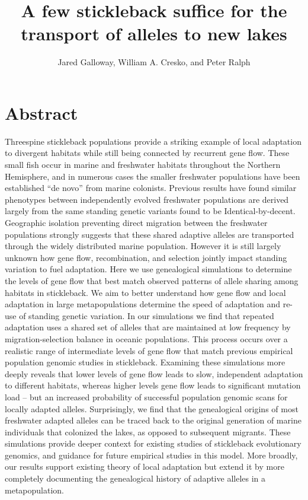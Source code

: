 \documentclass{article}
\begin{document}
\title{A few stickleback suffice for the transport of alleles to new lakes}
\author{Jared Galloway, William A. Cresko, and Peter Ralph}
\maketitle


\section*{Abstract}

Threespine stickleback populations provide a striking example of local adaptation to divergent habitats while still being connected by recurrent gene flow. 
These small fish occur in marine and freshwater habitats throughout the Northern Hemisphere, and in numerous cases the smaller freshwater populations have been established ``de novo'' from marine colonists. 
Previous results have found similar phenotypes between independently evolved freshwater populations are derived largely from the same standing genetic variants found to be Identical-by-decent.
Geographic isolation preventing direct migration between the freshwater populations strongly suggests that these shared adaptive alleles are transported through the widely distributed marine population.
However it is still largely unknown how gene flow, recombination, and selection jointly impact standing variation to fuel adaptation.
Here we use genealogical simulations to determine the levels of gene flow that best match observed patterns of allele sharing among habitats in stickleback.
We aim to better understand how gene flow and local adaptation in large metapopulations determine the speed of adaptation and re-use of standing genetic variation. 
In our simulations we find that repeated adaptation uses a shared set of alleles that are maintained at low frequency by migration-selection balance in oceanic populations. 
This process occurs over a realistic range of intermediate levels of gene flow that match previous empirical population genomic studies in stickleback. 
Examining these simulations more deeply reveals that lower levels of gene flow leads to slow, independent adaptation to different habitats, whereas higher levels gene flow leads to significant mutation load -- but an increased probability of successful population genomic scans for locally adapted alleles. 
Surprisingly, we find that the genealogical origins of most freshwater adapted alleles can be traced back to the original generation of marine individuals that colonized the lakes, as opposed to subsequent migrants. 
These simulations provide deeper context for existing studies of stickleback evolutionary genomics, and guidance for future empirical studies in this model.
More broadly, our results support existing theory of local adaptation but extend it by more completely documenting the genealogical history of adaptive alleles in a metapopulation.  
\end{document}
